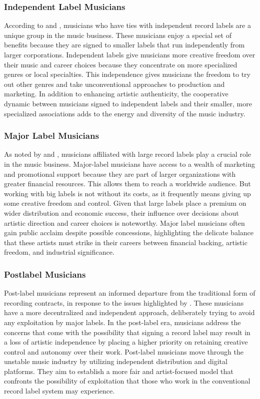 \subsubsection{Independent Label Musicians}
According to \textcite{arditi21} and \textcite{martinez21}, musicians who have ties with independent record labels are a unique group in the music business. These musicians enjoy a special set of benefits because they are signed to smaller labels that run independently from larger corporations. Independent labels give musicians more creative freedom over their music and career choices because they concentrate on more specialized genres or local specialties. This independence gives musicians the freedom to try out other genres and take unconventional approaches to production and marketing. In addition to enhancing artistic authenticity, the cooperative dynamic between musicians signed to independent labels and their smaller, more specialized associations adds to the energy and diversity of the music industry.

\subsubsection{Major Label Musicians}
As noted by \textcite{arditi21} and \textcite{martinez21}, musicians affiliated with large record labels play a crucial role in the music business. Major-label musicians have access to a wealth of marketing and promotional support because they are part of larger organizations with greater financial resources. This allows them to reach a worldwide audience. But working with big labels is not without its costs, as it frequently means giving up some creative freedom and control. Given that large labels place a premium on wider distribution and economic success, their influence over decisions about artistic direction and career choices is noteworthy. Major label musicians often gain public acclaim despite possible concessions, highlighting the delicate balance that these artists must strike in their careers between financial backing, artistic freedom, and industrial significance.

\subsubsection{Postlabel Musicians}
Post-label musicians represent an informed departure from the traditional form of recording contracts, in response to the issues highlighted by \textcite{arditi21}. These musicians have a more decentralized and independent approach, deliberately trying to avoid any exploitation by major labels. In the post-label era, musicians address the concerns that come with the possibility that signing a record label may result in a loss of artistic independence by placing a higher priority on retaining creative control and autonomy over their work. Post-label musicians move through the unstable music industry by utilizing independent distribution and digital platforms. They aim to establish a more fair and artist-focused model that confronts the possibility of exploitation that those who work in the conventional record label system may experience.

